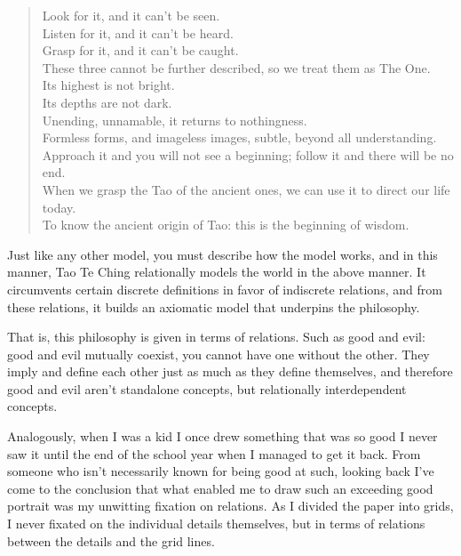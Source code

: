 \begin{verse}
Look for it, and it can't be seen.\\
Listen for it, and it can't be heard.\\
Grasp for it, and it can't be caught.\\
These three cannot be further described, so we treat them as The One.\\

Its highest is not bright.\\
Its depths are not dark.\\

Unending, unnamable, it returns to nothingness.\\
Formless forms, and imageless images, subtle, beyond all understanding.\\

Approach it and you will not see a beginning; follow it and there will be no end.\\
When we grasp the Tao of the ancient ones, we can use it to direct our life today.\\
To know the ancient origin of Tao: this is the beginning of wisdom.\\
\end{verse}

Just like any other model, you must describe how the model works, and in this manner, Tao Te Ching relationally models the world in the above manner. It circumvents certain discrete definitions in favor of indiscrete relations, and from these relations, it builds an axiomatic model that underpins the philosophy.

That is, this philosophy is given in terms of relations. Such as good and evil: good and evil mutually coexist, you cannot have one without the other. They imply and define each other just as much as they define themselves, and therefore good and evil aren’t standalone concepts, but relationally interdependent concepts.

Analogously, when I was a kid I once drew something that was so good I never saw it until the end of the school year when I managed to get it back. From someone who isn’t necessarily known for being good at such, looking back I’ve come to the conclusion that what enabled me to draw such an exceeding good portrait was my unwitting fixation on relations. As I divided the paper into grids, I never fixated on the individual details themselves, but in terms of relations between the details and the grid lines.

